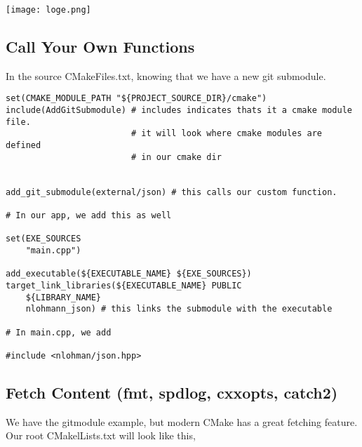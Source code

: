 \begin{center}
    \texttt{[image: loge.png]}
\end{center}

\subsection{Call Your Own Functions}

In the source CMakeFiles.txt, knowing that we have a new git submodule.

\begin{verbatim}
set(CMAKE_MODULE_PATH "${PROJECT_SOURCE_DIR}/cmake")
include(AddGitSubmodule) # includes indicates thats it a cmake module file.
                         # it will look where cmake modules are defined
                         # in our cmake dir


add_git_submodule(external/json) # this calls our custom function.

# In our app, we add this as well

set(EXE_SOURCES
    "main.cpp")

add_executable(${EXECUTABLE_NAME} ${EXE_SOURCES})
target_link_libraries(${EXECUTABLE_NAME} PUBLIC
    ${LIBRARY_NAME}
    nlohmann_json) # this links the submodule with the executable

# In main.cpp, we add 

#include <nlohman/json.hpp>
\end{verbatim}


\subsection{Fetch Content (fmt, spdlog, cxxopts, catch2)}

We have the gitmodule example, but modern CMake has a great fetching feature. Our root CMakelLists.txt will look like this, 

